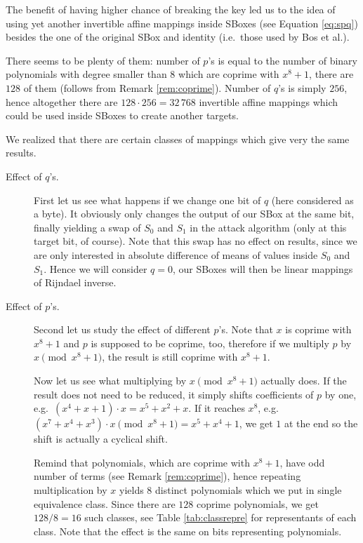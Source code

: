 The benefit of having higher chance of breaking the key led us to the idea of using yet another invertible affine mappings inside SBoxes (see Equation \ref{eq:spq}) besides the one of the original SBox and identity (i.e.\ those used by Bos et al.).

There seems to be plenty of them: number of $p$'s is equal to the number of binary polynomials with degree smaller than $8$ which are coprime with $x^8+1$, there are $128$ of them (follows from Remark \ref{rem:coprime}). Number of $q$'s is simply $256$, hence altogether there are $128\cdot 256 = 32\,768$ invertible affine mappings which could be used inside SBoxes to create another targets.

\newpage   %

\begin{remark}
\label{rem:pqeffect}
	We realized that there are certain classes of mappings which give very the same results.
	\begin{description}
		\item[Effect of $q$'s.]
			First let us see what happens if we change one bit of $q$ (here considered as a byte). It obviously only changes the output of our SBox at the same bit, finally yielding a swap of $S_0$ and $S_1$ in the attack algorithm (only at this target bit, of course). Note that this swap has no effect on results, since we are only interested in absolute difference of means of values inside $S_0$ and $S_1$. Hence we will consider $q = 0$, our SBoxes will then be linear mappings of Rijndael inverse.
		
		\item[Effect of $p$'s.]
			Second let us study the effect of different $p$'s. Note that $x$ is coprime with $x^8+1$ and $p$ is supposed to be coprime, too, therefore if we multiply $p$ by $x\pmod{x^8+1}$, the result is still coprime with $x^8+1$.
			
			Now let us see what multiplying by $x\pmod{x^8+1}$ actually does. If the result does not need to be reduced, it simply shifts coefficients of $p$ by one, e.g.\ $(x^4 + x + 1) \cdot x = x^5 + x^2 + x$. If it reaches $x^8$, e.g.\ $(x^7 + x^4 + x^3) \cdot x \pmod{x^8+1} = x^5 + x^4 + 1$, we get $1$ at the end so the shift is actually a cyclical shift.
			
			Remind that polynomials, which are coprime with $x^8+1$, have odd number of terms (see Remark \ref{rem:coprime}), hence repeating multiplication by $x$ yields $8$ distinct polynomials which we put in single equivalence class. Since there are $128$ coprime polynomials, we get $128/8=16$ such classes, see Table \ref{tab:classrepre} for representants of each class. Note that the effect is the same on bits representing polynomials.
			

\end{description}
\end{remark}
